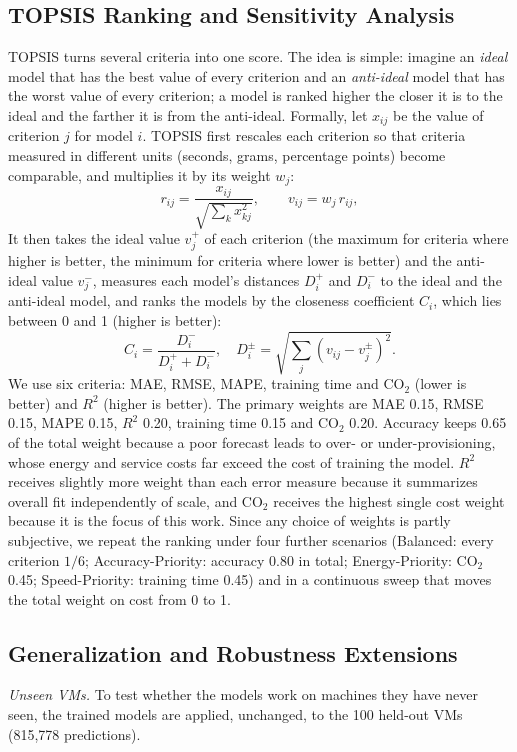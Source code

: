 \documentclass[conference,letterpaper,10pt]{IEEEtran}
\begin{document}
\subsection{TOPSIS Ranking and Sensitivity Analysis}
\label{sec:m-topsis}
TOPSIS \cite{hwang1981topsis} turns several criteria into one score. The idea is simple: imagine an \emph{ideal} model that has the best value of every criterion and an \emph{anti-ideal} model that has the worst value of every criterion; a model is ranked higher the closer it is to the ideal and the farther it is from the anti-ideal. Formally, let $x_{ij}$ be the value of criterion $j$ for model $i$. TOPSIS first rescales each criterion so that criteria measured in different units (seconds, grams, percentage points) become comparable, and multiplies it by its weight $w_j$:
\begin{equation}
r_{ij}=\frac{x_{ij}}{\sqrt{\sum_{k}x_{kj}^2}},\qquad v_{ij}=w_j\,r_{ij},
\end{equation}
It then takes the ideal value $v_j^+$ of each criterion (the maximum for criteria where higher is better, the minimum for criteria where lower is better) and the anti-ideal value $v_j^-$, measures each model's distances $D_i^+$ and $D_i^-$ to the ideal and the anti-ideal model, and ranks the models by the closeness coefficient $C_i$, which lies between 0 and 1 (higher is better):
\begin{equation}
C_i=\frac{D_i^-}{D_i^++D_i^-},\quad D_i^{\pm}=\sqrt{\textstyle\sum_j\left(v_{ij}-v_j^{\pm}\right)^2}.
\end{equation}
We use six criteria: MAE, RMSE, MAPE, training time and CO$_2$ (lower is better) and $R^2$ (higher is better). The primary weights are MAE 0.15, RMSE 0.15, MAPE 0.15, $R^2$ 0.20, training time 0.15 and CO$_2$ 0.20. Accuracy keeps 0.65 of the total weight because a poor forecast leads to over- or under-provisioning, whose energy and service costs far exceed the cost of training the model. $R^2$ receives slightly more weight than each error measure because it summarizes overall fit independently of scale, and CO$_2$ receives the highest single cost weight because it is the focus of this work. Since any choice of weights is partly subjective, we repeat the ranking under four further scenarios (Balanced: every criterion $1/6$; Accuracy-Priority: accuracy 0.80 in total; Energy-Priority: CO$_2$ 0.45; Speed-Priority: training time 0.45) and in a continuous sweep that moves the total weight on cost from 0 to 1.

\subsection{Generalization and Robustness Extensions}
\label{sec:m-robust}
\textit{Unseen VMs.} To test whether the models work on machines they have never seen, the trained models are applied, unchanged, to the 100 held-out VMs (815{,}778 predictions).
\end{document}
